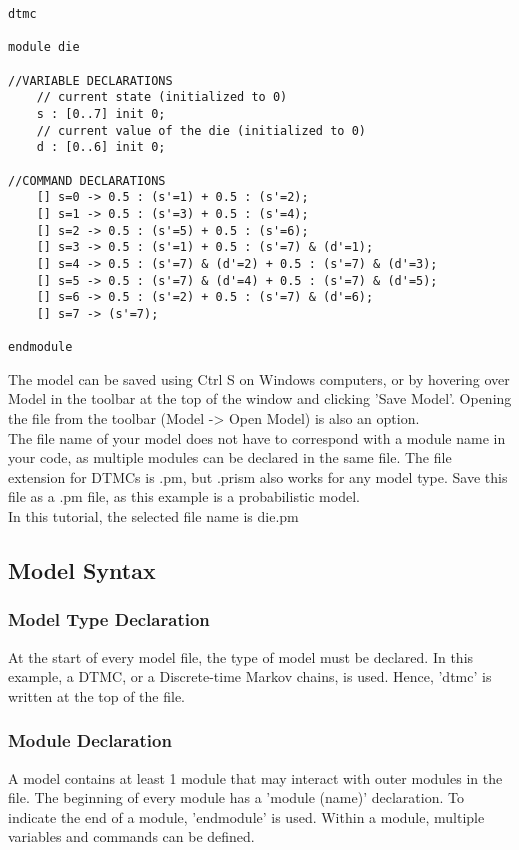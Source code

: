 \documentclass[a4paper]{article}
\begin{document}
\begin{lstlisting}
dtmc

module die

//VARIABLE DECLARATIONS
	// current state (initialized to 0)
	s : [0..7] init 0;
	// current value of the die (initialized to 0)
	d : [0..6] init 0;
	
//COMMAND DECLARATIONS
	[] s=0 -> 0.5 : (s'=1) + 0.5 : (s'=2);
	[] s=1 -> 0.5 : (s'=3) + 0.5 : (s'=4);
	[] s=2 -> 0.5 : (s'=5) + 0.5 : (s'=6);
	[] s=3 -> 0.5 : (s'=1) + 0.5 : (s'=7) & (d'=1);
	[] s=4 -> 0.5 : (s'=7) & (d'=2) + 0.5 : (s'=7) & (d'=3);
	[] s=5 -> 0.5 : (s'=7) & (d'=4) + 0.5 : (s'=7) & (d'=5);
	[] s=6 -> 0.5 : (s'=2) + 0.5 : (s'=7) & (d'=6);
	[] s=7 -> (s'=7);
	
endmodule

\end{lstlisting}

The model can be saved using Ctrl S on Windows computers, or by hovering over Model in the toolbar at the top of the window and clicking 'Save Model'. Opening the file from the toolbar (Model -> Open Model) is also an option. 
\\[1\baselineskip]
The file name of your model does not have to correspond with a module name in your code, as multiple modules can be declared in the same file. The file extension for DTMCs is .pm, but .prism also works for any model type. Save this file as a .pm file, as this example is a probabilistic model.
\\[1\baselineskip]
In this tutorial, the selected file name is die.pm
\subsection{Model Syntax}

\subsubsection{Model Type Declaration}
At the start of every model file, the type of model must be declared. In this example, a DTMC, or a Discrete-time Markov chains, is used. Hence, 'dtmc' is written at the top of the file.
\subsubsection{Module Declaration} A model contains at least 1 module that may interact with outer modules in the file. The beginning of every module has a 'module (name)' declaration. To indicate the end of a module, 'endmodule' is used. 
Within a module, multiple variables and commands can be defined.
\end{document}
